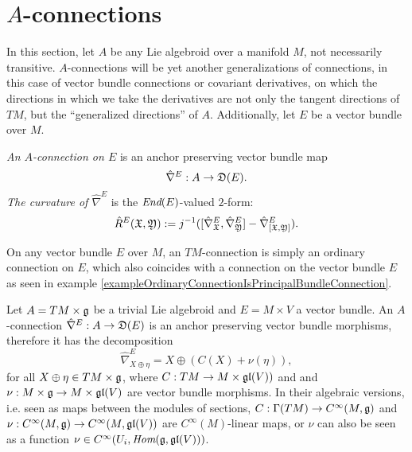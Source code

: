 \section{$A$-connections}
\label{ChConenctionsectionAConnections}

In this section, let $A$ be any Lie algebroid over a manifold $M$, not necessarily transitive. $A$-connections will be yet another generalizations of connections, in this case of vector bundle connections or covariant derivatives, on which the directions in which we take the derivatives are not only the tangent directions of $TM$, but the ``generalized directions'' of $A$. Additionally, let $E$ be a vector bundle over $M$.

\begin{definition}
\emph{An $A$-connection on $E$} is an anchor preserving vector bundle map
\begin{equation}
    \hat \nabla^E: A \to \mathfrak{D}(E).
\end{equation}
\emph{The curvature of $\hat \nabla^E$} is the $\operatorname{\textit{End}}(E)$-valued $2$-form:
\begin{equation}
    \hat R^E(\mathfrak{X}, \mathfrak{Y}) := j^{-1}([\hat \nabla^E_{\mathfrak{X}}, \hat \nabla^E_{\mathfrak{Y}}] - \hat \nabla^E_{[\mathfrak{X}, \mathfrak{Y}]}).
\end{equation}
\end{definition}

\begin{example}
On any vector bundle $E$ over $M$, an $TM$-connection is simply an ordinary connection on $E$, which also coincides with a connection on the vector bundle $E$ as seen in example \ref{exampleOrdinaryConnectionIsPrincipalBundleConnection}.
\end{example}

\begin{example}
\label{exampleAllTLATrivialLieAlgebroidConnectionsOnTrivialVectorBundle}
Let $A = TM \times \mathfrak{g}$ be a trivial Lie algebroid and $E = M \times V$ a vector bundle. An $A$-connection $\hat \nabla^E: A \to \mathfrak{D}(E)$ is an anchor preserving vector bundle morphisms, therefore it has the decomposition
\begin{equation}
    \hat \nabla^E_{X \oplus \eta} = X \oplus (C(X) + \nu(\eta)),
\end{equation}
for all $X \oplus \eta \in TM \times \mathfrak{g}$, where
$C: TM \to M \times \mathfrak{gl}(V))$ and and $\nu: M \times \mathfrak{g} \to M \times \mathfrak{gl}(V)$ are vector bundle morphisms. In their algebraic versions, i.e. seen as maps between the modules of sections, $C : \Gamma(TM) \to C^\infty(M, \mathfrak{g})$ and $\nu: C^\infty(M, \mathfrak{g}) \to C^\infty(M, \mathfrak{gl}(V))$ are $C^\infty(M)$-linear maps, or $\nu$ can also be seen as a function $\nu \in C^\infty(U_i, \operatorname{\textit{Hom}}(\mathfrak{g}, \mathfrak{gl}(V)))$.
\end{example}

